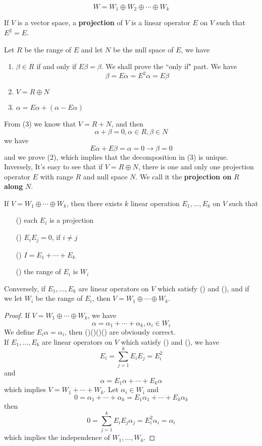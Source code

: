 \documentclass{article}
\begin{document}
\[W=W_1\oplus W_2\oplus\cdots\oplus W_k\] 
\begin{dde}
	If $V$ is a vector space, a \textbf{projection} of $V$ is a linear operator $E$ on $V$ such that $E^2=E$.
\end{dde}
Let $R$ be the range of $E$ and let $N$ be the null space of $E$, we have
\begin{enumerate}
	\item $\beta\in R$ if and only if $E\beta=\beta$. We shall prove the ``only if" part. We have
	\[\beta=E\alpha=E^2\alpha=E\beta\]
	\item $V=R\oplus N$
	\item $\alpha=E\alpha+(\alpha-E\alpha)$
\end{enumerate}
From (3) we know that $V=R+N$, and then
\[\alpha+\beta=0,\alpha\in R,\beta\in N\]
we have
\[E\alpha+E\beta=\alpha=0\rightarrow\beta=0\]
and we prove (2), which implies that the decomposition in (3) is unique.\\
\indent Inversely, It's easy to see that if $V=R\oplus N$, there is one and only one projection operator $E$ with range $R$ and null space $N$. We call it the \textbf{projection on} $R$ \textbf{along} $N$.
\begin{thm}\label{directsumdecomposition}
	If $V=W_1\oplus\cdots\oplus W_k$, then there exists $k$ linear operation $E_1,\dots,E_k$ on $V$ such that
	\begin{enumerate}
		\item [(\romannumeral1)]each $E_i$ is a projection
		\item [(\romannumeral2)]$E_iE_j=0$, if $i\neq j$
		\item [(\romannumeral3)]$I=E_1+\cdots+E_k$
		\item [(\romannumeral4)]the range of $E_i$ is $W_i$
	\end{enumerate}
	Conversely, if $E_1,\dots,E_k$ are linear operators on $V$ which satisfy () and (), and if we let $W_i$ be the range of $E_i$, then $V=W_1\oplus\cdots\oplus W_k$.
\end{thm}
\begin{proof}
	If $V=W_1\oplus\cdots\oplus W_k$, we have
	\[\alpha=\alpha_1+\cdots+\alpha_k,\alpha_i\in W_i\]
	We define $E_i\alpha=\alpha_i$, then ()()()() are obviously correct.\\
	If $E_1,\dots,E_k$ are linear operators on $V$ which satisfy () and (), we have
	\[E_i=\sum\limits_{j=1}^kE_iE_j=E_i^2\]
	and
	\[\alpha=E_1\alpha+\cdots+E_k\alpha\]
	which implies $V=W_1+\cdots+W_k$. Let $\alpha_i\in W_i$ and
	\[0=\alpha_1+\cdots+\alpha_k=E_1\alpha_1+\cdots+E_k\alpha_k\]
	then
	\[0=\sum\limits_{j=1}^kE_iE_j\alpha_j=E_i^2\alpha_i=\alpha_i\]
	which implies the independence of $W_1,\dots,W_k$.
\end{proof}
\end{document}
